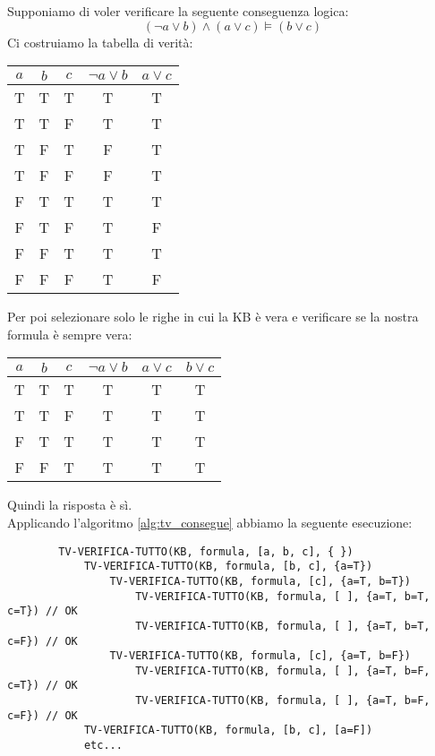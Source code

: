 \begin{example}
	Supponiamo di voler verificare la seguente conseguenza logica:
	\begin{equation*}
		(\neg a\lor b)\land(a \lor c) \models (b \lor c)
	\end{equation*}
	Ci costruiamo la tabella di verità:
	\begin{table}[!h]
		\centering
		\begin{tabular}{|ccc|cc|}
			\hline
			$a$&$b$&$c$&$\neg a \lor b$ & $a \lor c$ \\
			\hline
			T & T & T & T & T\\
			T & T& F & T & T \\
			T & F &T&F&T\\
			T&F&F&F&T\\
			F&T&T&T&T\\
			F&T&F&T&F\\
			F&F&T&T&T\\
			F&F&F&T&F\\
			\hline
		\end{tabular}
	\end{table}
	Per poi selezionare solo le righe in cui la KB è vera e verificare se la nostra formula è sempre vera:
	\begin{table}[!h]
		\centering
		\begin{tabular}{|ccc|cc|c|}
			\hline
			$a$&$b$&$c$&$\neg a \lor b$ & $a \lor c$ & $b\lor c$\\
			\hline
			T & T & T & T & T & T\\
			T & T& F & T & T & T\\
			F&T&T&T&T & T\\
			F&F&T&T&T&T\\
			\hline
		\end{tabular}
	\end{table}
	Quindi la risposta è sì.\\
	Applicando l'algoritmo \ref{alg:tv_consegue} abbiamo la seguente esecuzione:
	\begin{lstlisting}
		TV-VERIFICA-TUTTO(KB, formula, [a, b, c], { })
			TV-VERIFICA-TUTTO(KB, formula, [b, c], {a=T})
				TV-VERIFICA-TUTTO(KB, formula, [c], {a=T, b=T})
					TV-VERIFICA-TUTTO(KB, formula, [ ], {a=T, b=T, c=T}) // OK
					TV-VERIFICA-TUTTO(KB, formula, [ ], {a=T, b=T, c=F}) // OK
				TV-VERIFICA-TUTTO(KB, formula, [c], {a=T, b=F})
					TV-VERIFICA-TUTTO(KB, formula, [ ], {a=T, b=F, c=T}) // OK
					TV-VERIFICA-TUTTO(KB, formula, [ ], {a=T, b=F, c=F}) // OK
			TV-VERIFICA-TUTTO(KB, formula, [b, c], [a=F])
			etc...
	\end{lstlisting}
\end{example}
